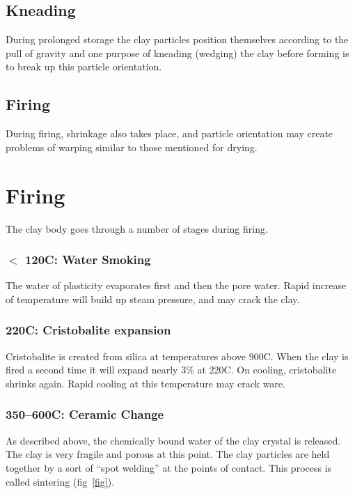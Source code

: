 \subsection{Kneading}
During prolonged storage the clay particles position themselves according to 
the pull of gravity and one purpose of kneading (wedging) the clay before 
forming is to break up this particle orientation.
\subsection{Firing}
During firing, shrinkage also takes place, and particle orientation may create 
problems of warping similar to those mentioned for drying.
\section{Firing}
The clay body goes through a number of stages during firing.
\subsubsection{$<$ 120\degree C: Water Smoking}
The water of plasticity evaporates first and then the pore water. Rapid 
increase of temperature will build up steam pressure, and may crack the clay.
\subsubsection{220\degree C: Cristobalite expansion}
Cristobalite is created from silica at temperatures above 900\degree C. When 
the clay is fired a second time it will expand nearly 3\% at 220\degree C. On 
cooling, cristobalite shrinks again. Rapid cooling at this temperature may 
crack ware.
\subsubsection{350--600\degree C: Ceramic Change}
As described above, the chemically bound water of the clay crystal is released. 
The clay is very fragile and porous at this point. The clay particles are held 
together by a sort of ``spot welding'' at the points of contact. This process 
is called sintering (fig~\ref{fig}).

